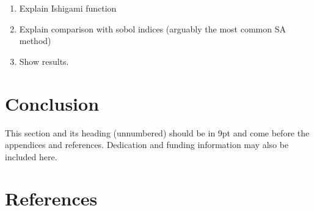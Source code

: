 \documentclass[twocolumn]{rps-esrel2022}
\begin{document}
\begin{enumerate}
	\item Explain Ishigami function
	\item Explain comparison with sobol indices (arguably the most common SA method)
	\item Show results.
\end{enumerate}

\section{Conclusion}

\begin{acknowledgement}
This section and its heading (unnumbered) should be in 9pt and come before the appendices and references.  Dedication and funding information may also be included here. 

\section*{References}



\end{acknowledgement}
\end{document}
